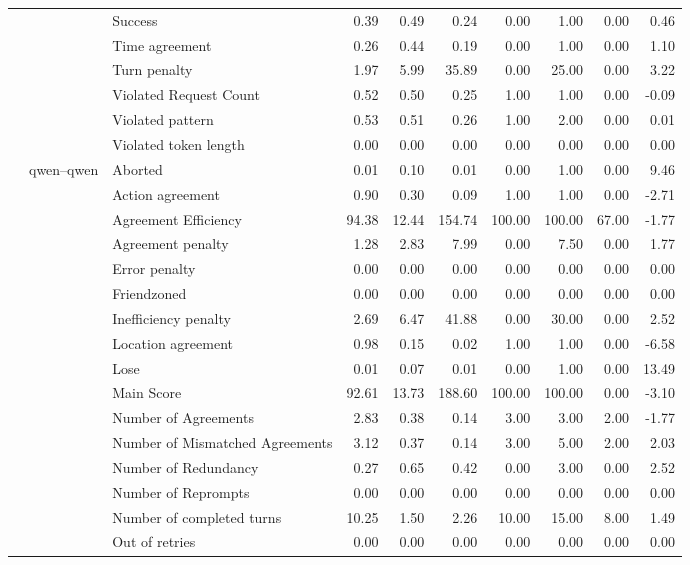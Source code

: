 \begin{tabular}{lllrrrrrrr}
 &  & Success & 0.39 & 0.49 & 0.24 & 0.00 & 1.00 & 0.00 & 0.46 \\
 &  & Time agreement & 0.26 & 0.44 & 0.19 & 0.00 & 1.00 & 0.00 & 1.10 \\
 &  & Turn penalty & 1.97 & 5.99 & 35.89 & 0.00 & 25.00 & 0.00 & 3.22 \\
 &  & Violated Request Count & 0.52 & 0.50 & 0.25 & 1.00 & 1.00 & 0.00 & -0.09 \\
 &  & Violated pattern & 0.53 & 0.51 & 0.26 & 1.00 & 2.00 & 0.00 & 0.01 \\
 &  & Violated token length & 0.00 & 0.00 & 0.00 & 0.00 & 0.00 & 0.00 & 0.00 \\
\cline{2-10}
 & \multirow[t]{27}{*}{qwen--qwen} & Aborted & 0.01 & 0.10 & 0.01 & 0.00 & 1.00 & 0.00 & 9.46 \\
 &  & Action agreement & 0.90 & 0.30 & 0.09 & 1.00 & 1.00 & 0.00 & -2.71 \\
 &  & Agreement Efficiency & 94.38 & 12.44 & 154.74 & 100.00 & 100.00 & 67.00 & -1.77 \\
 &  & Agreement penalty & 1.28 & 2.83 & 7.99 & 0.00 & 7.50 & 0.00 & 1.77 \\
 &  & Error penalty & 0.00 & 0.00 & 0.00 & 0.00 & 0.00 & 0.00 & 0.00 \\
 &  & Friendzoned & 0.00 & 0.00 & 0.00 & 0.00 & 0.00 & 0.00 & 0.00 \\
 &  & Inefficiency penalty & 2.69 & 6.47 & 41.88 & 0.00 & 30.00 & 0.00 & 2.52 \\
 &  & Location agreement & 0.98 & 0.15 & 0.02 & 1.00 & 1.00 & 0.00 & -6.58 \\
 &  & Lose & 0.01 & 0.07 & 0.01 & 0.00 & 1.00 & 0.00 & 13.49 \\
 &  & Main Score & 92.61 & 13.73 & 188.60 & 100.00 & 100.00 & 0.00 & -3.10 \\
 &  & Number of Agreements & 2.83 & 0.38 & 0.14 & 3.00 & 3.00 & 2.00 & -1.77 \\
 &  & Number of Mismatched Agreements & 3.12 & 0.37 & 0.14 & 3.00 & 5.00 & 2.00 & 2.03 \\
 &  & Number of Redundancy & 0.27 & 0.65 & 0.42 & 0.00 & 3.00 & 0.00 & 2.52 \\
 &  & Number of Reprompts & 0.00 & 0.00 & 0.00 & 0.00 & 0.00 & 0.00 & 0.00 \\
 &  & Number of completed turns & 10.25 & 1.50 & 2.26 & 10.00 & 15.00 & 8.00 & 1.49 \\
 &  & Out of retries & 0.00 & 0.00 & 0.00 & 0.00 & 0.00 & 0.00 & 0.00 \\

\end{tabular}
